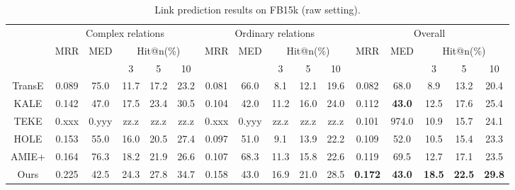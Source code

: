 

\begin{table*}[ht]
	\small
	\centering
	\caption{Link prediction results on FB15k (raw setting).}
	\begin{tabular}{|c|ccccc|ccccc|ccccc|}
		\hline
				&	\multicolumn{5}{c|}{Complex relations}
				&	\multicolumn{5}{c|}{Ordinary relations}
				&	\multicolumn{5}{c|}{Overall}	\\
		\cline{2-16}	
		\multirow{2}{*}{}	&	\multirow{2}{*}{MRR}	&	\multirow{2}{*}{MED}	&	\multicolumn{3}{c|}{Hit@n(\%)}
							&	\multirow{2}{*}{MRR}	&	\multirow{2}{*}{MED}	&	\multicolumn{3}{c|}{Hit@n(\%)}
							&	\multirow{2}{*}{MRR}	&	\multirow{2}{*}{MED}	&	\multicolumn{3}{c|}{Hit@n(\%)}	\\
				&	&	&	3	&	5	&	10	
				&	&	&	3	&	5	&	10	
				&	&	&	3	&	5	&	10	\\
		\hline
		TransE
				&	0.089	&	75.0	&	11.7	&	17.2	&	23.2
				&	0.081	&	66.0	&	 8.1	&	12.1	&	19.6
				&	0.082	&	68.0	&	 8.9	&	13.2	&	20.4	\\
		KALE	
				&	0.142	&	47.0	&	17.5	&	23.4	&	30.5
				&	0.104	&	42.0	&	11.2	&	16.0	&	24.0
				&	0.112	&	\textbf{43.0}	&	12.5	&	17.6	&	25.4	\\
		TEKE	
				&	0.xxx	&	0.yyy	&	zz.z	&	zz.z	&	zz.z
				&	0.xxx	&	0.yyy	&	zz.z	&	zz.z	&	zz.z
				&	0.101	&	974.0	&	10.9	&	15.7	&	24.1	\\
		HOLE
				&	0.153	&	55.0	&	16.0	&	20.5	&	27.4
				&	0.097	&	51.0	&	 9.1	&	13.9	&	22.2
				&	0.109	&	52.0	&	10.5	&	15.4	&	23.3	\\
		AMIE+
				&	0.164	&	76.3	&	18.2	&	21.9	&	26.6
				&	0.107	&	68.3	&	11.3	&	15.8	&	22.6
				&	0.119	&	69.5	&	12.7	&	17.1	&	23.5	\\
		Ours
				&	0.225	&	42.5	&	24.3	&	27.8	&	34.7
				&	0.158	&	43.0	&	16.9	&	21.0	&	28.5
				&	\textbf{0.172}	&	\textbf{43.0}	&	\textbf{18.5}	&	\textbf{22.5}	&	\textbf{29.8}	\\
		\hline
	\end{tabular}
	\label{tab:link-pred-raw}
\end{table*}


